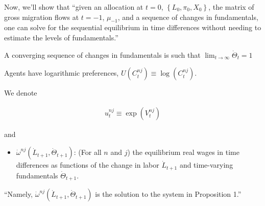 \documentclass[10pt]{article}
\begin{document}
Now, we'll show that ``given 
an allocation at $t=0$, $\left\{L_0, \pi_0, X_0\right\}$, 
the matrix of gross migration flows at $t = -1$, $\mu_{-1}$,
and a sequence of changes in fundamentals, one can solve for the 
sequential equilibrium in time differences 
without needing to estimate the levels of fundamentals.''

\begin{definition} 
    A converging sequence of changes in fundamentals is such that $\lim _{t \rightarrow \infty} \dot{\Theta}_t=1$
\end{definition}

\begin{notes}[Assumption]
    Agents have logarithmic preferences, $U\left(C_t^{n j}\right) \equiv \log \left(C_t^{n j}\right)$.
\end{notes}

We denote

\begin{align}
    u_t^{n j} \equiv \exp \left(V_t^{n j}\right)
\end{align}

and 

\begin{itemize}
    \item $\dot{\omega}^{n j}\left(\dot{L}_{t+1}, \dot{\Theta}_{t+1}\right)$: (For all 
    $n$ and $j$) the equilibrium real wages in time differences 
    as functions of the change
    in labor $\dot{L}_{t+1}$ and time-varying fundamentals $\dot{\Theta}_{t+1}$.
\end{itemize}


``Namely, $\dot{\omega}^{n j}\left(\dot{L}_{t+1}, \dot{\Theta}_{t+1}\right)$ is the solution
to the system in Proposition 1.''
\end{document}
